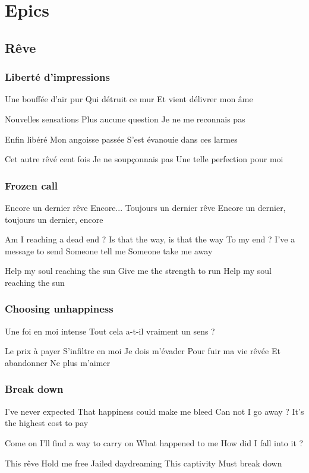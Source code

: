 \documentclass{article}
\newenvironment{album}[1]%
{%
  \section*{#1}
}%
{%
}
\newenvironment{song}[1]%
{%
  \subsection*{\textbf{#1}}
  \begin{multicols*}{2}
}%
{%
  \end{multicols*}
  \newpage
}
\newenvironment{partie}[1]%
{%
  \subsubsection{#1}
}%
{%
}
\newenvironment{couplet} %
{%
  \verbatim
}%
{% end code
  \endverbatim
}
\newenvironment{refrain} %
{%
  \verbatim
}%
{% end code
  \endverbatim
}
\begin{document}
\begin{album}{Epics}
\begin{song}{Rêve}
\begin{partie}{Liberté d'impressions}
\begin{refrain}
Une bouffée d'air pur
Qui détruit ce mur
Et vient délivrer mon âme
\end{refrain}
\begin{couplet}
Nouvelles sensations
Plus aucune question
Je ne me reconnais pas 
\end{couplet}  
\begin{refrain}
Enfin libéré
Mon angoisse passée
S'est évanouie dans ces larmes

Cet autre rêvé cent fois
Je ne soupçonnais pas
Une telle perfection pour moi 
\end{refrain}  
\end{partie}
\begin{partie}{Frozen call}
\begin{couplet}
Encore un dernier rêve
Encore...
Toujours un dernier rêve
Encore un dernier, toujours un dernier, encore
\end{couplet}
\begin{couplet}
Am I reaching a dead end ?
Is that the way, is that the way
To my end ?
I've a message to send
Someone tell me
Someone take me away
\end{couplet}
\begin{refrain}
Help my soul reaching the sun
Give me the strength to run
Help my soul reaching the sun 
\end{refrain}  
\end{partie}
\begin{partie}{Choosing unhappiness}
\begin{couplet}
Une foi en moi intense
Tout cela a-t-il vraiment un sens ?
\end{couplet}
\begin{refrain}
Le prix à payer
S'infiltre en moi
Je dois m'évader
Pour fuir ma vie rêvée
Et abandonner
Ne plus m'aimer
\end{refrain}
\end{partie}
\begin{partie}{Break down}
\begin{couplet}
I've never expected 
That happiness could make me bleed
Can not I go away ?
It's the highest cost to pay
\end{couplet}
\begin{couplet}
Come on
I'll find a way to carry on
What happened to me
How did I fall into it ?  
\end{couplet}  
\begin{refrain}
This rêve
Hold me free
Jailed daydreaming
This captivity
Must break down  
\end{refrain}

\end{partie}
\end{song}
\end{album}
\end{document}
